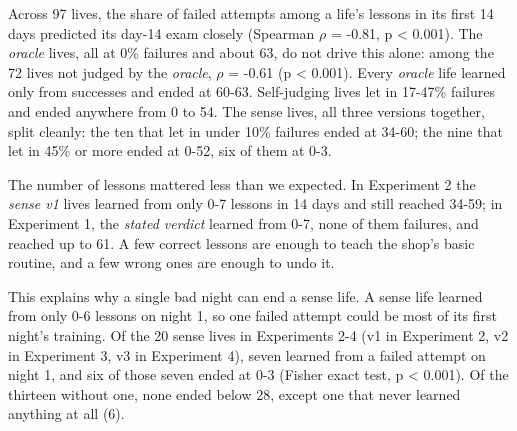 Across 97 lives, the share of failed attempts among a life's lessons in its first 14 days predicted its day-14 exam closely (Spearman $\rho$ = -0.81, p \textless{} 0.001). The \emph{oracle} lives, all at 0\% failures and about 63, do not drive this alone: among the 72 lives not judged by the \emph{oracle}, $\rho$ = -0.61 (p \textless{} 0.001). Every \emph{oracle} life learned only from successes and ended at 60-63. Self-judging lives let in 17-47\% failures and ended anywhere from 0 to 54. The sense lives, all three versions together, split cleanly: the ten that let in under 10\% failures ended at 34-60; the nine that let in 45\% or more ended at 0-52, six of them at 0-3.

The number of lessons mattered less than we expected. In Experiment 2 the \emph{sense v1} lives learned from only 0-7 lessons in 14 days and still reached 34-59; in Experiment 1, the \emph{stated verdict} learned from 0-7, none of them failures, and reached up to 61. A few correct lessons are enough to teach the shop's basic routine, and a few wrong ones are enough to undo it.

This explains why a single bad night can end a sense life. A sense life learned from only 0-6 lessons on night 1, so one failed attempt could be most of its first night's training. Of the 20 sense lives in Experiments 2-4 (v1 in Experiment 2, v2 in Experiment 3, v3 in Experiment 4), seven learned from a failed attempt on night 1, and six of those seven ended at 0-3 (Fisher exact test, p \textless{} 0.001). Of the thirteen without one, none ended below 28, except one that never learned anything at all (6).
